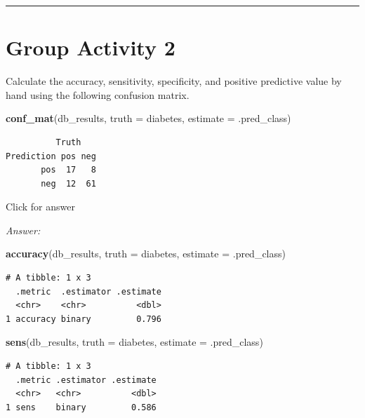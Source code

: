 \documentclass[
]{book}
\newenvironment{Shaded}{\begin{snugshade}}{\end{snugshade}}
\newcommand{\AttributeTok}[1]{\textcolor[rgb]{0.13,0.29,0.53}{#1}}
\newcommand{\FunctionTok}[1]{\textcolor[rgb]{0.13,0.29,0.53}{\textbf{#1}}}
\newcommand{\NormalTok}[1]{#1}
\begin{document}
\begin{center}\rule{0.5\linewidth}{0.5pt}\end{center}

\hypertarget{group-activity-2-6}{%
\section{Group Activity 2}\label{group-activity-2-6}}

Calculate the accuracy, sensitivity, specificity, and positive predictive value by hand using the following confusion matrix.

\begin{Shaded}
\begin{Highlighting}[]
\FunctionTok{conf\_mat}\NormalTok{(db\_results, }\AttributeTok{truth =}\NormalTok{ diabetes, }\AttributeTok{estimate =}\NormalTok{ .pred\_class)}
\end{Highlighting}
\end{Shaded}

\begin{verbatim}
          Truth
Prediction pos neg
       pos  17   8
       neg  12  61
\end{verbatim}

Click for answer

\emph{Answer:}

\begin{Shaded}
\begin{Highlighting}[]
\FunctionTok{accuracy}\NormalTok{(db\_results, }\AttributeTok{truth =}\NormalTok{ diabetes,}
         \AttributeTok{estimate =}\NormalTok{ .pred\_class)}
\end{Highlighting}
\end{Shaded}

\begin{verbatim}
# A tibble: 1 x 3
  .metric  .estimator .estimate
  <chr>    <chr>          <dbl>
1 accuracy binary         0.796
\end{verbatim}

\begin{Shaded}
\begin{Highlighting}[]
\FunctionTok{sens}\NormalTok{(db\_results, }\AttributeTok{truth =}\NormalTok{ diabetes,}
         \AttributeTok{estimate =}\NormalTok{ .pred\_class)}
\end{Highlighting}
\end{Shaded}

\begin{verbatim}
# A tibble: 1 x 3
  .metric .estimator .estimate
  <chr>   <chr>          <dbl>
1 sens    binary         0.586
\end{verbatim}
\end{document}
